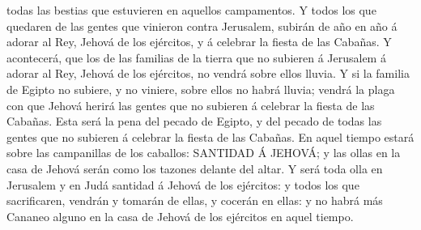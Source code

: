 todas las bestias que estuvieren en aquellos campamentos. 
Y todos los que quedaren de las gentes que vinieron contra Jerusalem,
subirán de año en año á adorar al Rey, Jehová de los ejércitos, y á
celebrar la fiesta de las Cabañas.  Y acontecerá, que los
de las familias de la tierra que no subieren á Jerusalem á adorar al
Rey, Jehová de los ejércitos, no vendrá sobre ellos lluvia.
 Y si la familia de Egipto no subiere, y no viniere, sobre
ellos no habrá lluvia; vendrá la plaga con que Jehová herirá las gentes
que no subieren á celebrar la fiesta de las Cabañas.  Esta
será la pena del pecado de Egipto, y del pecado de todas las gentes que
no subieren á celebrar la fiesta de las Cabañas.  En aquel
tiempo estará sobre las campanillas de los caballos: SANTIDAD Á JEHOVÁ;
y las ollas en la casa de Jehová serán como los tazones delante del
altar.  Y será toda olla en Jerusalem y en Judá santidad á
Jehová de los ejércitos: y todos los que sacrificaren, vendrán y tomarán
de ellas, y cocerán en ellas: y no habrá más Cananeo alguno en la casa
de Jehová de los ejércitos en aquel tiempo.
